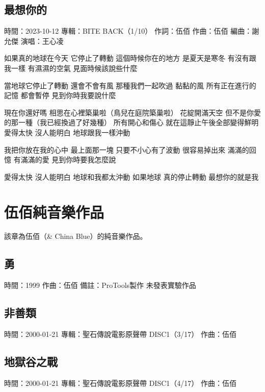 \documentclass[UTF8,a4paper,oneside,twocolumn,12pt]{ctexbook}
\newcommand{\infopair}[2]{\textbullet #1：#2}
\newcommand{\zc}[1][伍佰]{\infopair{作詞}{#1}}
\newcommand{\zq}[1][伍佰]{\infopair{作曲}{#1}}
\newcommand{\bq}[1][伍佰]{\infopair{編曲}{#1}}
\newcommand{\zj}[1]{\infopair{專輯}{#1}}
\newcommand{\sj}[1]{\infopair{時間}{#1}}
\newcommand{\bz}[1]{\infopair{備註}{#1}}
\newenvironment{info}{\begin{flushleft}\kaishu
	}
	{\end{flushleft}\normalsize\yahei\par}
\newenvironment{lyric}{
	}
{}
\begin{document}
\section{最想你的}
\begin{info}
	\sj{2023-10-12}
	\zj{BITE BACK（1/10）}
	\zc
	\zq
	\bq[謝允傑]
	\infopair{演唱}{王心凌}
\end{info}
\begin{lyric}%
	如果真的地球在今天 它停止了轉動
	這個時候你在的地方 是夏天是寒冬
	有沒有跟我一樣 有濕濕的空氣
	見面時候該說些什麼

	當地球它停止了轉動 還會不會有風
	那種我們一起吹過 黏黏的風
	所有正在進行的記憶 都會暫停
	見到你時我要說什麼

	現在你還好嗎 相思在心裡築巢啦（鳥兒在庭院築巢啦）
	花綻開滿天空 但不是你愛的那一種（我已經換過了好幾種）
	所有開心和傷心
	就在這靜止午後全部變得鮮明
	愛得太快 沒人能明白
	地球跟我一樣沖動

	我把你放在我的心中 最上面那一塊
	只要不小心有了波動 很容易掉出來
	滿滿的回憶 有滿滿的愛
	見到你時要我怎麼說

	愛得太快 沒人能明白
	地球和我都太沖動
	如果地球 真的停止轉動
	最想你的就是我
\end{lyric}

\chapter{伍佰純音樂作品}
該章為伍佰（\& China Blue）的純音樂作品。

\section{勇}%
\begin{info}
	\sj{1999}
	\zq
	\bz{ProTools製作 未發表實驗作品}
\end{info}

\section{非善類}
\begin{info}
	\sj{2000-01-21}
	\zj{聖石傳說電影原聲帶 DISC1（3/17）}
	\zq
\end{info}

\section{地獄谷之戰}
\begin{info}
	\sj{2000-01-21}
	\zj{聖石傳說電影原聲帶 DISC1（4/17）}
	\zq
\end{info}
\end{document}
